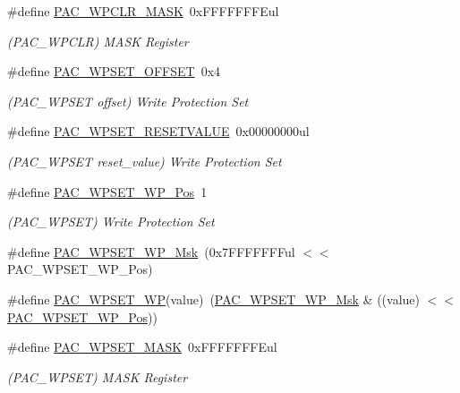 \begin{DoxyCompactItemize}
\item 
\#define \mbox{\hyperlink{group___s_a_m_d21___p_a_c_gae4e15876b40798f9de30c63a21941fe2}{P\+A\+C\+\_\+\+W\+P\+C\+L\+R\+\_\+\+M\+A\+SK}}~0x\+F\+F\+F\+F\+F\+F\+F\+Eul
\begin{DoxyCompactList}\small\item\em (P\+A\+C\+\_\+\+W\+P\+C\+LR) M\+A\+SK Register \end{DoxyCompactList}\item 
\#define \mbox{\hyperlink{group___s_a_m_d21___p_a_c_ga1f78e51c36aefe33adf2cd3e8aae712d}{P\+A\+C\+\_\+\+W\+P\+S\+E\+T\+\_\+\+O\+F\+F\+S\+ET}}~0x4
\begin{DoxyCompactList}\small\item\em (P\+A\+C\+\_\+\+W\+P\+S\+ET offset) Write Protection Set \end{DoxyCompactList}\item 
\#define \mbox{\hyperlink{group___s_a_m_d21___p_a_c_ga98a9ec65abc9267cd8450753c2242423}{P\+A\+C\+\_\+\+W\+P\+S\+E\+T\+\_\+\+R\+E\+S\+E\+T\+V\+A\+L\+UE}}~0x00000000ul
\begin{DoxyCompactList}\small\item\em (P\+A\+C\+\_\+\+W\+P\+S\+ET reset\+\_\+value) Write Protection Set \end{DoxyCompactList}\item 
\#define \mbox{\hyperlink{group___s_a_m_d21___p_a_c_gac6aa32046f2c00bae5a1dcc2aec55e12}{P\+A\+C\+\_\+\+W\+P\+S\+E\+T\+\_\+\+W\+P\+\_\+\+Pos}}~1
\begin{DoxyCompactList}\small\item\em (P\+A\+C\+\_\+\+W\+P\+S\+ET) Write Protection Set \end{DoxyCompactList}\item 
\#define \mbox{\hyperlink{group___s_a_m_d21___p_a_c_gaad1cd626f26b3904a3564b687c71f449}{P\+A\+C\+\_\+\+W\+P\+S\+E\+T\+\_\+\+W\+P\+\_\+\+Msk}}~(0x7\+F\+F\+F\+F\+F\+F\+Ful $<$$<$ P\+A\+C\+\_\+\+W\+P\+S\+E\+T\+\_\+\+W\+P\+\_\+\+Pos)
\item 
\#define \mbox{\hyperlink{group___s_a_m_d21___p_a_c_ga87da15384c0ecc5dd7fa5f217817b99b}{P\+A\+C\+\_\+\+W\+P\+S\+E\+T\+\_\+\+WP}}(value)~(\mbox{\hyperlink{group___s_a_m_d21___p_a_c_gaad1cd626f26b3904a3564b687c71f449}{P\+A\+C\+\_\+\+W\+P\+S\+E\+T\+\_\+\+W\+P\+\_\+\+Msk}} \& ((value) $<$$<$ \mbox{\hyperlink{group___s_a_m_d21___p_a_c_gac6aa32046f2c00bae5a1dcc2aec55e12}{P\+A\+C\+\_\+\+W\+P\+S\+E\+T\+\_\+\+W\+P\+\_\+\+Pos}}))
\item 
\#define \mbox{\hyperlink{group___s_a_m_d21___p_a_c_gad8dcbe373d2b7cabb1ae14527fc59027}{P\+A\+C\+\_\+\+W\+P\+S\+E\+T\+\_\+\+M\+A\+SK}}~0x\+F\+F\+F\+F\+F\+F\+F\+Eul
\begin{DoxyCompactList}\small\item\em (P\+A\+C\+\_\+\+W\+P\+S\+ET) M\+A\+SK Register \end{DoxyCompactList}\end{DoxyCompactItemize}


